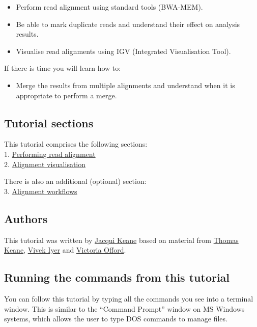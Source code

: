 \documentclass[11pt]{article}
\providecommand{\tightlist}{%
      \setlength{\itemsep}{0pt}\setlength{\parskip}{0pt}}
\begin{document}
\begin{itemize}
\tightlist
\item
  Perform read alignment using standard tools (BWA-MEM).
\item
  Be able to mark duplicate reads and understand their effect on analysis
  results.
\item
  Visualise read alignments using IGV (Integrated Visualisation Tool).
\end{itemize}

If there is time you will learn how to:

\begin{itemize}
\tightlist
\item
  Merge the results from multiple alignments and understand when it is
  appropriate to perform a merge.
\end{itemize}

\hypertarget{tutorial-sections}{%
\subsection{Tutorial sections}\label{tutorial-sections}}

This tutorial comprises the following sections:\\
1. \href{alignment.ipynb}{Performing read alignment}\\
2. \href{visualisation.ipynb}{Alignment visualisation}

There is also an additional (optional) section: \\
3. \href{workflows.ipynb}{Alignment workflows}

\hypertarget{authors}{%
\subsection{Authors}\label{authors}}

This tutorial was written by
\href{https://github.com/jacquikeane}{Jacqui Keane} based on material
from \href{https://github.com/tk2}{Thomas Keane},
\href{https://github.com/vviyer}{Vivek Iyer} and
\href{https://github.com/vo1}{Victoria Offord}.

\hypertarget{running-the-commands-from-this-tutorial}{%
\subsection{Running the commands from this
tutorial}\label{running-the-commands-from-this-tutorial}}

You can follow this tutorial by typing all the commands you see into a
terminal window. This is similar to the ``Command Prompt'' window on MS
Windows systems, which allows the user to type DOS commands to manage
files.
\end{document}
